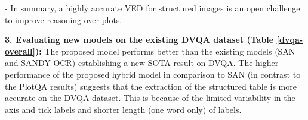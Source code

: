 \documentclass[10pt,twocolumn,letterpaper]{article}
\begin{document}
- In summary, a highly accurate VED for structured images %
is an open challenge to improve reasoning over plots. 

\noindent \textbf{3. Evaluating new models on the existing DVQA dataset (Table \ref{dvqa-overall}):} 
The proposed model performs better than the existing models (SAN and SANDY-OCR) establishing a new SOTA result on DVQA. 
The higher performance of the proposed hybrid model in comparison to SAN (in contrast to the PlotQA results) suggests that the extraction of the structured table is more accurate on the DVQA dataset.
This is because of the limited variability in the axis and tick labels and shorter length (one word only) of labels. 
\end{document}
